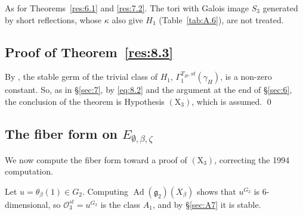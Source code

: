 \documentclass[12pt,letterpaper]{amsart}
\theoremstyle{plain}
\theoremstyle{definition}
\theoremstyle{remark}
\theoremstyle{definition}
\DeclareMathOperator{\Ad}{Ad}
\begin{document}
\begin{rem26}\label{rem:8.3}
As for Theorems~\ref{res:6.1} and \ref{res:7.2}. The tori with Galois image
$S_3$ generated by short reflections, whose $\kappa$ also give $H_1$
(Table~\ref{tab:A.6}), are not treated.
\end{rem26}

\subsection*{Proof of \texorpdfstring{Theorem~\ref{res:8.3}}{Theorem 8.3}}

By \cite{Ro80}, the stable germ of the trivial class of $H_1$,
$\Gamma_{1}^{T_H,st}(\gamma_H)$, is a non-zero constant. So, as in
\S\ref{sec:7}, by \eqref{eq:8.2} and the argument at the end of \S\ref{sec:6},
the conclusion of the theorem is Hypothesis $(\mathrm X_3)$, which is assumed.
\qed

\subsection*{The fiber form on \texorpdfstring{$E_{\emptyset,\beta,\zeta}$}{E(0,beta,zeta)}}

We now compute the fiber form toward a proof of $(\mathrm X_3)$, correcting the
1994 computation.

Let $u=\theta_{\beta}(1)\in G_2$. Computing
$\Ad({\mathfrak g}_2)(X_\beta)$ shows that $u^{G_2}$
is $6$-dimensional, so ${\mathcal O}_3^{st}=u^{G_2}$ is the class $A_1$, and
by \S\ref{sec:A7} it is stable.
\end{document}
